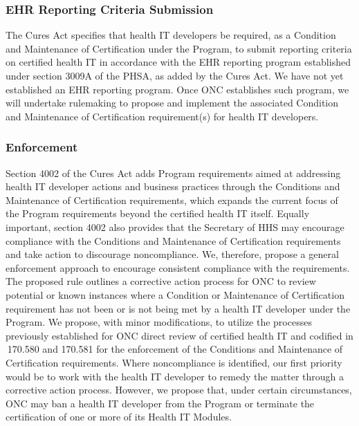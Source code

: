 \documentclass[twoside,11pt]{article}
\begin{document}
          \subsubsection{EHR Reporting Criteria Submission}

          The Cures Act specifies that health IT developers be required, as a Condition and Maintenance of Certification under the Program, to submit reporting criteria on certified health IT in accordance with the EHR reporting program established under section 3009A of the PHSA, as added by the Cures Act. We have not yet established an EHR reporting program. Once ONC establishes such program, we will undertake rulemaking to propose and implement the associated Condition and Maintenance of Certification requirement(s) for health IT developers.


          \subsubsection{Enforcement}

          Section 4002 of the Cures Act adds Program requirements aimed at addressing health IT developer actions and business practices through the Conditions and Maintenance of Certification requirements, which expands the current focus of the Program requirements beyond the certified health IT itself. Equally important, section 4002 also provides that the Secretary of HHS may encourage compliance with the Conditions and Maintenance of Certification requirements and take action to discourage noncompliance. We, therefore, propose a general enforcement approach to encourage consistent compliance with the requirements. The proposed rule outlines a corrective action process for ONC to review potential or known instances where a Condition or Maintenance of Certification requirement has not been or is not being met by a health IT developer under the Program. We propose, with minor modifications, to utilize the processes previously established for ONC direct review of certified health IT and codified in \textsection{}\textsection{} 170.580 and 170.581 for the enforcement of the Conditions and Maintenance of Certification requirements. Where noncompliance is identified, our first priority would be to work with the health IT developer to remedy the matter through a corrective action process. However, we propose that, under certain circumstances, ONC may ban a health IT developer from the Program or terminate the certification of one or more of its Health IT Modules.
\end{document}
